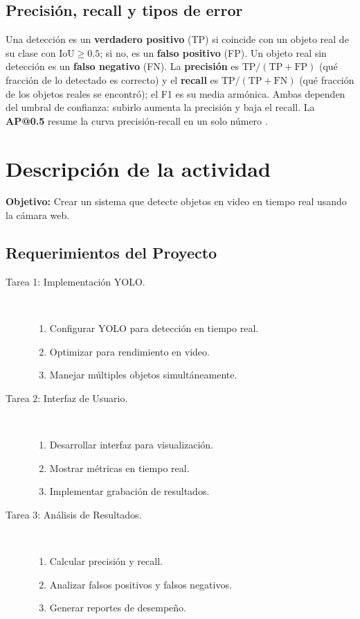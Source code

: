 \documentclass[11pt,letterpaper]{article}
\begin{document}
\subsection{Precisión, recall y tipos de error}

Una detección es un \textbf{verdadero positivo} (TP) si coincide con un objeto real de su clase con $\mathrm{IoU}\geq 0.5$; si no, es un \textbf{falso positivo} (FP). Un objeto real sin detección es un \textbf{falso negativo} (FN). La \textbf{precisión} es $\mathrm{TP}/(\mathrm{TP}+\mathrm{FP})$ (qué fracción de lo detectado es correcto) y el \textbf{recall} es $\mathrm{TP}/(\mathrm{TP}+\mathrm{FN})$ (qué fracción de los objetos reales se encontró); el F1 es su media armónica. Ambas dependen del umbral de confianza: subirlo aumenta la precisión y baja el recall. La \textbf{AP@0.5} resume la curva precisión-recall en un solo número \parencite{elgendy2020}.

\section{Descripción de la actividad}

\textbf{Objetivo:} Crear un sistema que detecte objetos en video en tiempo real usando la cámara web.

\subsection*{Requerimientos del Proyecto}

\begin{description}
    \item[Tarea 1: Implementación YOLO.]\mbox{}\\[-1.3\baselineskip]
    \begin{enumerate}
        \item Configurar YOLO para detección en tiempo real.
        \item Optimizar para rendimiento en video.
        \item Manejar múltiples objetos simultáneamente.
    \end{enumerate}
    \item[Tarea 2: Interfaz de Usuario.]\mbox{}\\[-1.3\baselineskip]
    \begin{enumerate}
        \item Desarrollar interfaz para visualización.
        \item Mostrar métricas en tiempo real.
        \item Implementar grabación de resultados.
    \end{enumerate}
    \item[Tarea 3: Análisis de Resultados.]\mbox{}\\[-1.3\baselineskip]
    \begin{enumerate}
        \item Calcular precisión y recall.
        \item Analizar falsos positivos y falsos negativos.
        \item Generar reportes de desempeño.
    \end{enumerate}
\end{description}
\end{document}
